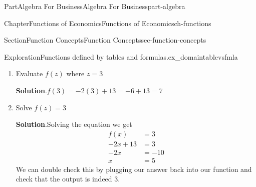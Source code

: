 \documentclass[oneside,10pt,]{tufte-book}
\newcommand{\blocktitlefont}{\relax}
\numberwithin{equation}{chapter}
\newcommand{\amp}{&}
\begin{document}
\begin{partptx}{Part}{Algebra For Business}{}{Algebra For Business}{}{}{part-algebra}
\begin{chapterptx}{Chapter}{Functions of Economics}{}{Functions of Economics}{}{}{ch-functions}
\begin{sectionptx}{Section}{Function Concepts}{}{Function Concepts}{}{}{sec-function-concepts}
\begin{exploration}{Exploration}{Functions defined by tables and formulas.}{ex_domaintablevsfmla}
\begin{enumerate}[font=\bfseries,label=(\alph*),ref=\alph*]
\begin{enumerate}[font=\bfseries,label=(\roman*),ref=\theenumi.\roman*]
\noindent\textbf{\blocktitlefont Solution}.\hypertarget{ex_domaintablevsfmla-4-3-2}{}\quad{}We can solve the inequality as follows%
\begin{align*}
f(x) \amp > 0 \\
-2x + 13 \amp > 0\\
13 \amp > 2x \amp \text{add } 2x\text{ to both sides} \\
6.5 \amp > x \amp \text{divide by positive 2}
\end{align*}
We can also look at the graph of our function, draw the line \(y=0\), and take all \(x\) values where the function is above the line. From the graph below, this is the set of \(x\) to the left of 6.5.  In interval notation, this is%
\begin{equation*}
\Big(-\infty, 6.5\Big)
\end{equation*}
%
\begin{image}{0.25}{0.5}{0.25}{}%
%
\end{image}%
\item{}Evaluate \(f(z)\) where \(z=3\)%
\par\smallskip%
\noindent\textbf{\blocktitlefont Solution}.\hypertarget{ex_domaintablevsfmla-4-4-2}{}\quad{}\(f(3) = -2(3) + 13 = -6 + 13 = 7\)%
\item{}Solve \(f(z)=3\)%
\par\smallskip%
\noindent\textbf{\blocktitlefont Solution}.\hypertarget{ex_domaintablevsfmla-4-5-2}{}\quad{}Solving the equation we get%
\begin{align*}
f(x) \amp = 3\\
-2x+13\amp = 3\\
-2x    \amp = -10\\
x \amp = 5
\end{align*}
We can double check this by plugging our answer back into our function and check that the output is indeed \(3\).%
\end{enumerate}%
\end{enumerate}%

\end{exploration}
\end{sectionptx}
\end{chapterptx}
\end{partptx}
\end{document}
